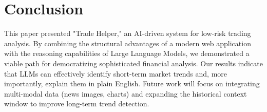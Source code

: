 \section{Conclusion}
This paper presented "Trade Helper," an AI-driven system for low-risk trading analysis. By combining the structural advantages of a modern web application with the reasoning capabilities of Large Language Models, we demonstrated a viable path for democratizing sophisticated financial analysis. Our results indicate that LLMs can effectively identify short-term market trends and, more importantly, explain them in plain English. Future work will focus on integrating multi-modal data (news images, charts) and expanding the historical context window to improve long-term trend detection.
